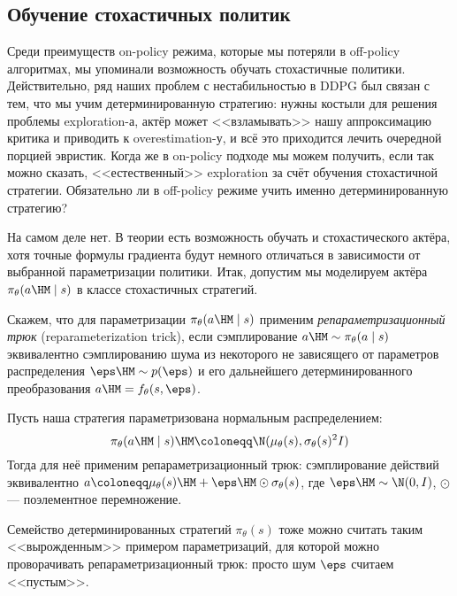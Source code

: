 \subsection{Обучение стохастичных политик}\label{subsec:stochpolicies}

Среди преимуществ on-policy режима, которые мы потеряли в off-policy алгоритмах, мы упоминали возможность обучать стохастичные политики. Действительно, ряд наших проблем с нестабильностью в DDPG был связан с тем, что мы учим детерминированную стратегию: нужны костыли для решения проблемы exploration-а, актёр может <<взламывать>> нашу аппроксимацию критика и приводить к overestimation-у, и всё это приходится лечить очередной порцией эвристик. Когда же в on-policy подходе мы можем получить, если так можно сказать, <<естественный>> exploration за счёт обучения стохастичной стратегии. Обязательно ли в off-policy режиме учить именно детерминированную стратегию?

На самом деле нет. В теории есть возможность обучать и стохастического актёра, хотя точные формулы градиента будут немного отличаться в зависимости от выбранной параметризации политики. Итак, допустим мы моделируем актёра $\pi_\theta(a \HM\mid s)$ в классе стохастичных стратегий.

\begin{definition}
Скажем, что для параметризации $\pi_\theta(a \HM\mid s)$ применим \emph{репараметризационный трюк} (reparameterization trick), если сэмплирование $a \HM\sim \pi_\theta(a \mid s)$ эквивалентно сэмплированию шума из некоторого не зависящего от параметров распределения $\eps \HM\sim p(\eps)$ и его дальнейшего детерминированного преобразования $a \HM= f_{\theta}(s, \eps)$.
\end{definition}

\begin{exampleBox}[label=ex:gaussian_policy]{}
Пусть наша стратегия параметризована нормальным распределением:
$$\pi_\theta(a \HM\mid s) \HM\coloneqq \N(\mu_\theta(s), \sigma_\theta(s)^2I)$$
Тогда для неё применим репараметризационный трюк: сэмплирование действий эквивалентно $a \coloneqq \mu_\theta(s) \HM+ \eps \HM\odot \sigma_\theta(s)$, где $\eps \HM\sim \N(0, I)$, $\odot$ --- поэлементное перемножение.
\end{exampleBox}

\begin{example}
Семейство детерминированных стратегий $\pi_\theta(s)$ тоже можно считать таким <<вырожденным>> примером параметризаций, для которой можно проворачивать репараметризационный трюк: просто шум $\eps$ считаем <<пустым>>.
\end{example}

